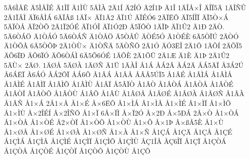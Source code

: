 {5^^c46^^cc^^c5^^ca
^^c45^^cc^^c5^^ce^^c9
^^c41^^cc^^cf
^^c41^^cc^^d9
5^^c4^^cc^^c0
2^^c41^^cd
^^c42^^cd^^d3
^^c42^^cd1^^de
^^c41^^ce
1^^c4^^ce^^c5^^d7^^ce
^^c4^^ce^^cf5^^c4
1^^c4^^ce^^d1^^db
2^^c41^^cf^^c2^^cc
^^c4^^cf6^^c2^^cc^^c1
6^^c4^^cf^^c2^^df
1^^c4^^cf^^d7
^^c4^^cf1^^c42
^^c4^^cf1^^da
^^c4^^cf^^c9^^d36
2^^c4^^cf^^cb^^d4
^^c4^^cf5^^cd^^ce^^cf
^^c4^^cf5^^d2^^d7^^c1
5^^c4^^cf^^d2^^c5
^^c4^^cf2^^d2^^d5
2^^c41^^cf2^^d3^^c9
^^c4^^cf1^^d3^^ce
^^c4^^cf1^^d32^^d0
^^c45^^cf^^d4^^d2
1^^c4^^cf^^de
^^c4^^cf1^^db2
^^c41^^d0
2^^c4^^d2.
5^^c46^^d2^^c1^^d6
^^c41^^d2^^c1^^d3
5^^c46^^d2^^c1^^d1
^^c41^^d2^^c5^^d6
^^c45^^d2^^c5^^db
^^c4^^d2^^c95^^d3
^^c41^^d2^^c9^^c8
6^^c45^^d2^^cf^^da
2^^c4^^d2^^d3
^^c41^^d2^^d5^^c2
6^^c45^^d2^^d5^^de
2^^c41^^d2^^d9^^d7
^^c41^^d2^^d1^^c4
5^^c4^^d2^^d1^^d4
2^^c41^^d3
^^c4^^d33^^cb^^ce
2^^c41^^d4
1^^c4^^d5^^cd
2^^c4^^d5^^cf5
^^c4^^d56^^cf^^d0
^^c4^^d56^^cf^^d3
^^c4^^d56^^d2^^c1^^cc
6^^c45^^d56^^d3^^c9
1^^c4^^d5^^c8
2^^c41^^d5^^dc
2^^c41^^c6
^^c41^^c8
^^c41^^de
2^^c41^^db2
5^^c4^^d9^^d7
2^^c4^^d8.
1^^c4^^d8^^c5
5^^c4^^d8^^c0
1^^c4^^d8^^d1
^^c41^^dc
1^^c4^^c0^^ce
^^c51^^c1
^^c5^^c12^^c2
^^c5^^c12^^c4
^^c5^^c15^^c4^^cf
^^c53^^c12^^da
^^c56^^c1^^cb^^cf
^^c56^^c1^^d3
^^c5^^c12^^d4^^cf
^^c5^^c16^^d5
^^c51^^c2^^c1
^^c51^^c2^^c5
^^c5^^c2^^c55^^da^^cf5
^^c51^^c2^^c9
^^c51^^c2^^cc^^c1
^^c51^^c2^^cc^^c5
^^c51^^c2^^cc^^c9
^^c51^^c2^^cc^^cf
^^c51^^c2^^cc^^d5
^^c51^^c2^^cc^^d9
^^c51^^c2^^cf
^^c55^^c2^^cf^^d2
^^c51^^c2^^d2
^^c51^^c2^^d2^^c1
^^c51^^c2^^d2^^c5
^^c51^^c2^^d2^^c9
^^c51^^c2^^d2^^cf
^^c51^^c2^^d2^^d5
^^c51^^c2^^d2^^d9
^^c51^^c2^^d5
^^c51^^c2^^d9
^^c51^^c2^^d8^^c5
^^c51^^c2^^d8^^c9
^^c51^^c2^^d8^^c0
^^c51^^c2^^d8^^d1
^^c51^^c2^^c0
^^c51^^c2^^d1
^^c51^^d7^^c1
2^^c51^^d7^^c5
^^c51^^d7^^c9
^^c5^^d76^^cb^^d5
^^c51^^d7^^cc^^c1
^^c51^^d7^^cc^^c5
^^c51^^d7^^cc^^c9
^^c51^^d7^^cc^^cf
^^c51^^d7^^cc^^d5
^^c51^^d7^^cc^^d9
^^c5^^d72^^ce^^c9^^cd
^^c5^^d72^^ce^^d1^^d4
^^c51^^d7^^cf
6^^c5^^d7^^cf^^cc
^^c5^^d7^^cf2^^d3
^^c5^^d72^^d0
^^c5^^d75^^d0^^c1
2^^c5^^d7^^d2
^^c51^^d7^^d2^^c1
^^c51^^d7^^d2^^c5
^^c51^^d7^^d2^^c9
^^c52^^d7^^d2^^cf
^^c51^^d7^^d2^^d5
^^c51^^d7^^d2^^d9
^^c51^^d7^^d5
^^c5^^d71^^de
^^c5^^d7^^df^^c55^^c8
^^c51^^d7^^d9
^^c51^^d7^^d8^^c5
^^c51^^d7^^d8^^c9
^^c51^^d7^^d8^^c0
^^c51^^d7^^d8^^d1
^^c51^^d7^^c0
^^c51^^d7^^d1
^^c51^^c7^^c1
^^c51^^c7^^c4
^^c51^^c7^^c5
^^c51^^c7^^c9
^^c51^^c7^^cc^^c1
^^c51^^c7^^cc^^c5
^^c51^^c7^^cc^^c9
^^c51^^c7^^cc^^cf
^^c51^^c7^^cc^^d5
^^c51^^c7^^cc^^d9
^^c5^^c71^^ce^^c5
^^c5^^c76^^ce^^cf
^^c51^^c7^^cf
^^c51^^c7^^d2^^c1
^^c51^^c7^^d2^^c5
^^c51^^c7^^d2^^c9
^^c51^^c7^^d2^^cf
^^c51^^c7^^d2^^d5
^^c51^^c7^^d2^^d9
^^c51^^c7^^d5
}
